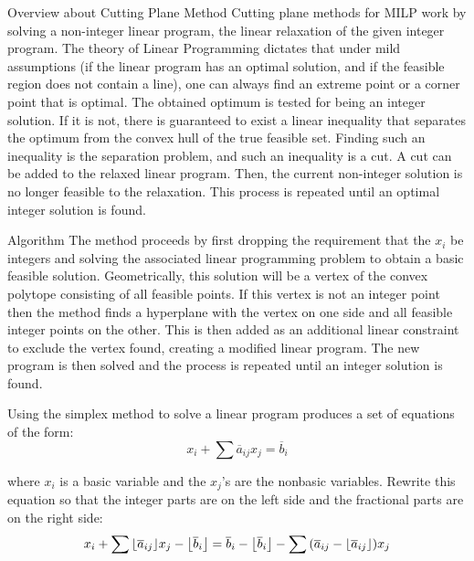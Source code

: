 \documentclass[9pt]{extarticle}
\DeclarePairedDelimiter\floor{\lfloor}{\rfloor}
\begin{document}
    \begin{section}{Overview about Cutting Plane Method}
        Cutting plane methods for MILP work by solving a non-integer linear program, the linear relaxation of the given integer 
        program. 
        The theory of Linear Programming dictates that under mild assumptions (if the linear program has an optimal solution, 
        and if the feasible region does not contain a line), one can always find an extreme point or a corner point that is 
        optimal. 
        The obtained optimum is tested for being an integer solution. 
        If it is not, there is guaranteed to exist a linear inequality that separates the optimum from the convex hull of the 
        true feasible set. 
        Finding such an inequality is the separation problem, and such an inequality is a cut. 
        A cut can be added to the relaxed linear program. Then, the current non-integer solution is no longer feasible to the 
        relaxation. 
        This process is repeated until an optimal integer solution is found. \cite{wiki:cuttingplane}
        
        \begin{subsection}{Algorithm}
            The method proceeds by first dropping the requirement that the $x_i$ be integers and solving the associated linear 
            programming problem to obtain a basic feasible solution. 
            Geometrically, this solution will be a vertex of the convex polytope consisting of all feasible points. 
            If this vertex is not an integer point then the method finds a hyperplane with the vertex on one side and all 
            feasible integer points on the other. 
            This is then added as an additional linear constraint to exclude the vertex found, creating a modified linear 
            program. 
            The new program is then solved and the process is repeated until an integer solution is found.
            \cite{wiki:cuttingplane}

            Using the simplex method to solve a linear program produces a set of equations of the form:
            \begin{equation*}
                x_i + \sum{\overline{a}_{ij}x_j} = \overline{b}_i
            \end{equation*}

            where $x_i$ is a basic variable and the $x_j$'s are the nonbasic variables. 
            Rewrite this equation so that the integer parts are on the left side and the fractional parts are on the right side:
            \begin{equation*}
                x_i + \sum{
                    \floor*{
                        \overline{a}_{ij}}
                    }x_j - \floor*{
                        \overline{b}_i
                     } = \overline{b}_i - \floor*{
                        \overline{b}_i
                     } - \sum{
                         (\overline{a}_{ij} - \floor*{
                            \overline{a}_{ij}
                        })x_j
                     }
            \end{equation*}


\end{subsection}
\end{section}
\end{document}
